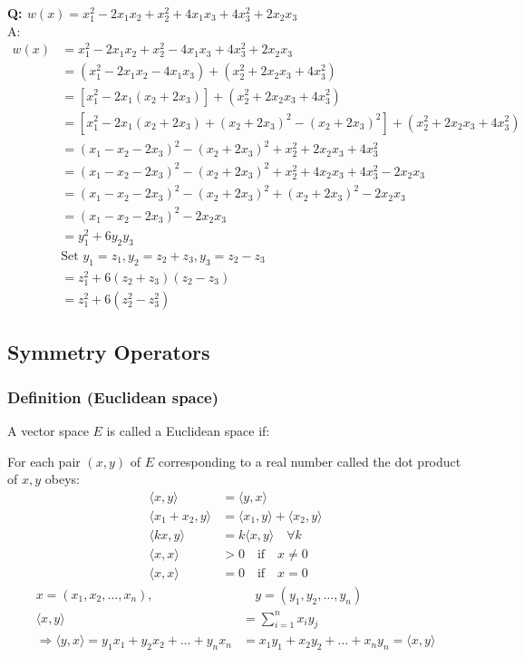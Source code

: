 \textbf{Q: $w(x) = x_1^2 - 2x_1x_2 + x_2^2+4x_1x_3 + 4x_3^2 + 2x_2x_3$}\\
A: \begin{align*}
    w(x) &= x_1^2 - 2x_1x_2 + x_2^2 - 4x_1x_3 + 4x_3^2 + 2x_2x_3\\
    &= (x_1^2 - 2x_1x_2 - 4x_1x_3) + (x_2^2 + 2x_2x_3 + 4x_3^2)\\
    &= [x_1^2 - 2x_1(x_2 + 2x_3)] + (x_2^2 + 2x_2x_3 + 4x_3^2)\\
    &= [x_1^2 - 2x_1(x_2 + 2x_3) + (x_2 + 2x_3)^2 - (x_2 + 2x_3)^2] + (x_2^2 + 2x_2x_3 + 4x_3^2)\\
    &= (x_1 - x_2 - 2x_3)^2 - (x_2 + 2x_3)^2 + x_2^2 + 2x_2x_3 + 4x_3^2\\
    &= (x_1 - x_2 - 2x_3)^2 - (x_2 + 2x_3)^2 + x_2^2 + 4x_2x_3 + 4x_3^2 - 2x_2x_3\\
    &= (x_1 - x_2 - 2x_3)^2 - (x_2 + 2x_3)^2 + (x_2 + 2x_3)^2 - 2x_2x_3\\
    &= (x_1 - x_2 - 2x_3)^2 - 2x_2x_3\\
    &= y_1^2 + 6y_2y_3\\
    &\textrm{Set } y_1 = z_1, y_2 = z_2 + z_3, y_3 = z_2 - z_3\\
    &= z_1^2 + 6(z_2 + z_3)(z_2 - z_3)\\
    &= z_1^2 + 6(z_2^2 - z_3^2)
\end{align*}

\subsection{Symmetry Operators}

\subsubsection{Definition (Euclidean space)}

A vector space $E$ is called a Euclidean space if:

For each pair $(x, y)$ of $E$ corresponding to a real number called the dot product of $x, y$ obeys:
\begin{align*}
    \langle x, y \rangle &= \langle y, x \rangle\\
    \langle x_1 + x_2, y \rangle &= \langle x_1, y \rangle + \langle x_2, y \rangle\\
    \langle kx, y \rangle &= k \langle x, y \rangle \quad \forall k\\
    \langle x, x \rangle &> 0 \quad \text{if} \quad x \neq 0\\
    \langle x, x \rangle &= 0 \quad \text{if} \quad x = 0
\end{align*}
\begin{align*}
    x = (x_1, x_2, \ldots, x_n), &\quad y = (y_1, y_2, \ldots, y_n)\\
    \langle x, y \rangle &= \sum_{i=1}^n x_iy_j\\
    \Rightarrow \langle y, x \rangle = y_1x_1 + y_2x_2 + \ldots + y_nx_n &= x_1y_1 + x_2y_2 + \ldots + x_ny_n = \langle x, y \rangle
\end{align*}
